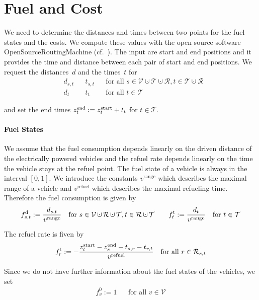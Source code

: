 \section{Fuel and Cost}
\label{sec:fuel_cost}

We need to determine the distances and times between two points for the fuel states and the costs. We compute these values with the open source software OpenSourceRoutingMachine (cf.~\cite{OSRM}). The input are start and end positions and it provides the time and distance between each pair of start and end positions. We request the distances~$d$ and the times~$t$ for
\begin{align*}
	& d_{s,t} && t_{s,t} && \text{for all } s\in\mathcal{V}\cupdot\mathcal{T}\cupdot\mathcal{R}, t\in\mathcal{T}\cupdot\mathcal{R} \\
	& d_t && t_t && \text{for all } t\in\mathcal{T}
\end{align*}

and set the end times ${z^{\operatorname{end}}_t := z^{\operatorname{start}}_t + t_t}$ for ${t\in\mathcal{T}}$.

\paragraph{Fuel States} \parfill

We assume that the fuel consumption depends linearly on the driven distance of the electrically powered vehicles and the refuel rate depends linearly on the time the vehicle stays at the refuel point. The fuel state of a vehicle is always in the interval $[0,1]$. We introduce the constants $v^{\operatorname{range}}$ which describes the maximal range of a vehicle and $v^{\operatorname{refuel}}$ which describes the maximal refueling time. Therefore the fuel consumption is given by
\begin{align*}
	\fd_{s,t} := \frac{d_{s,t}}{v^{\operatorname{range}}} && \text{for } s\in\mathcal{V}\cupdot\mathcal{R}\cupdot\mathcal{T}, t\in\mathcal{R}\cupdot\mathcal{T} && && \ft_t := \frac{d_t}{v^{\operatorname{range}}} && \text{for } t\in\mathcal{T}
\end{align*}

The refuel rate is fiven by
\begin{align*}
	f^{\operatorname{t}}_r := -\frac{z^{\operatorname{start}}_t - z^{\operatorname{end}}_s - t_{s,r} - t_{r,t}}{v^{\operatorname{refuel}}} && \text{for all } r\in\mathcal{R}_{s,t}
\end{align*}

Since we do not have further information about the fuel states of the vehicles, we set
\begin{align*}
	f^0_v := 1 && \text{for all } v\in\mathcal{V}
\end{align*}

